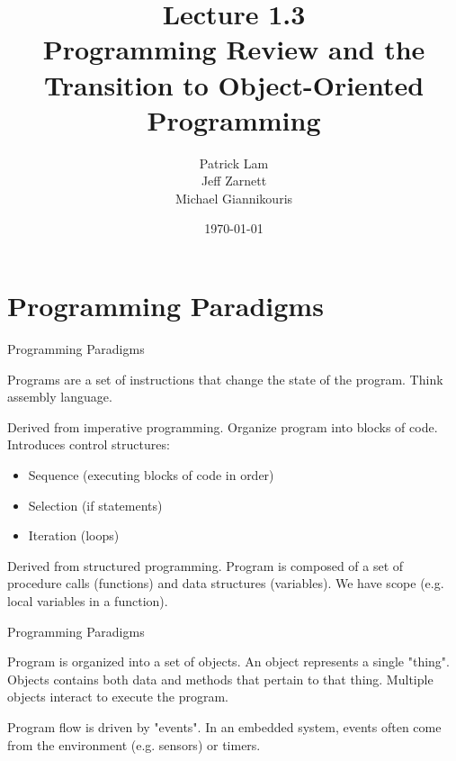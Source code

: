 \documentclass[aspectratio=169]{beamer}
\title{Lecture 1.3 \\ Programming Review and the Transition to Object-Oriented Programming}
\date{\today}
\author{Patrick Lam \\ Jeff Zarnett \\ Michael Giannikouris}
\institute{Department of Electrical and Computer Engineering}
\begin{document}
\maketitle

\section{Programming Paradigms}
  
\begin{frame}{Programming Paradigms}
	\begin{description}
	\setlength\itemsep{1em}
		\item[Imperative]		
		Programs are a set of instructions that change the state of the program. Think assembly language.
		
		\item[Structured]
		Derived from imperative programming. Organize program into blocks of code. Introduces control structures:
		
		\begin{itemize}
			\item Sequence	(executing blocks of code in order)
			\item Selection (if statements)
			\item Iteration (loops)
		\end{itemize}
		
		\item[Procedural]
		Derived from structured programming. Program is composed of a set of procedure calls (functions) and data structures (variables). We have scope (e.g. local variables in a function).

	\end{description}
\end{frame}  
  
\begin{frame}{Programming Paradigms}

	\begin{description}
	\setlength\itemsep{1em}
		\item[Object-Oriented (OOP)]
		Program is organized into a set of objects. An object represents a single "thing". Objects contains both data and methods that pertain to that thing. Multiple objects interact to execute the program.
		
		\item[Event-Driven]
		Program flow is driven by "events". In an embedded system, events often come from the environment (e.g. sensors) or timers.
	\end{description}
\end{frame}  
\end{document}

